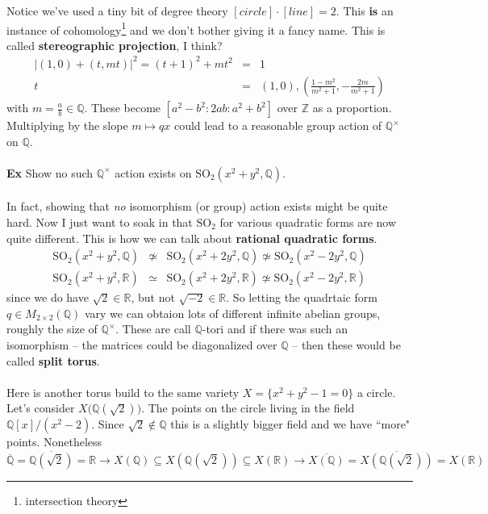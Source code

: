 \documentclass[12pt]{article}
\begin{document}
Notice we've used a tiny bit of degree theory $[circle]\cdot[line]=2 $.  This \textbf{is} an instance of cohomology\footnote{intersection theory} and we don't bother giving it a fancy name.  This is called \textbf{stereographic projection}, I think? 
\begin{eqnarray*}\big|(1,0)+ (t, mt) \big|^2 = (t+1)^2 + mt^2 &=& 1 \\
t  &=& (1,0) ,   (\tfrac{1-m^2}{m^2 + 1},- \tfrac{2m}{m^2+1}) \end{eqnarray*}
with $m = \frac{a}{b} \in \mathbb{Q}$.  These become $[a^2 - b^2 :2ab: a^2 + b^2]$ over $\mathbb{Z}$ as a proportion.  Multiplying by the slope $m \mapsto q x$ could lead to a reasonable group action of $\mathbb{Q}^\times$ on $\mathbb{Q}$. \\ \\
\textbf{Ex} Show no such $\mathbb{Q}^\times$ action exists on $\text{SO}_2(x^2 + y^2, \mathbb{Q})$.   \\ \\
In fact, showing that \textit{no} isomorphism (or group) action exists might be quite hard.  Now I just want to soak in that $\text{SO}_2$ for various quadratic forms are now quite different.  This is how we can talk about \textbf{rational quadratic forms}.
\begin{eqnarray*}
\text{SO}_2(x^2 + y^2, \mathbb{Q}) &\not \simeq& \text{SO}_2(x^2 + 2y^2, \mathbb{Q}) 
\not \simeq \text{SO}_2(x^2 -2 y^2, \mathbb{Q})  \\ 
\text{SO}_2(x^2 + y^2, \mathbb{R}) & \simeq& \text{SO}_2(x^2 + 2y^2, \mathbb{R}) 
 \not\simeq \text{SO}_2(x^2 -2 y^2, \mathbb{R})\end{eqnarray*}  
since we do have $\sqrt{2} \in \mathbb{R}$, but not $\sqrt{-2} \in \mathbb{R}$. So letting the quadrtaic form $q \in M_{2 \times 2} (\mathbb{Q})$ vary we can obtaion lots of different infinite abelian groups, roughly the size of $\mathbb{Q}^\times$.  These are call $\mathbb{Q}$-tori and if there was such an isomorphism -- the matrices could be diagonalized over $\mathbb{Q}$ -- then these would be called \textbf{split torus}. \\ \\
Here is another torus build to the same variety $X = \{ x^2 + y^2 - 1 = 0\}$ a circle.  Let's consider $X\big(\mathbb{Q}(\sqrt{2})\big)$.  The points on the circle living in the field $\mathbb{Q}[x]/(x^2 - 2)$.  Since $\sqrt{2} \notin \mathbb{Q}$ this is a slightly bigger field and we have ``more" points.  Nonetheless 
$$ \overline{\mathbb{Q}} = \overline{\mathbb{Q}(\sqrt{2})} = \mathbb{R}  \to X(\mathbb{Q}) \subseteq X(\mathbb{Q}(\sqrt{2})) \subseteq X(\mathbb{R})   
\to \overline{X(\mathbb{Q})} = \overline{X(\mathbb{Q}(\sqrt{2}))} = X(\mathbb{R})   $$
\end{document}
